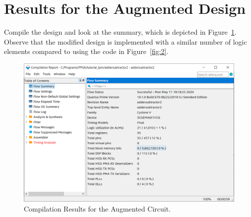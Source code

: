 \documentclass[11pt, twoside, pdftex]{article}
\newcommand{\commonPath}{../../../Common}
\begin{document}
\newpage
\section{Results for the Augmented Design}

Compile the design and look at the summary, which is depicted in Figure~\ref{fig:17}.
Observe that the modified design is implemented with a similar number of logic elements
compared to using the code in Figure~\ref{fig:2}.
 
\begin{figure}[H]
   \begin{center}
      \includegraphics[scale=0.70]{figures/figure17.png}
   \caption{Compilation Results for the Augmented Circuit.} 
	 \label{fig:17}
	 \end{center}
\end{figure} 

 


\end{document}
